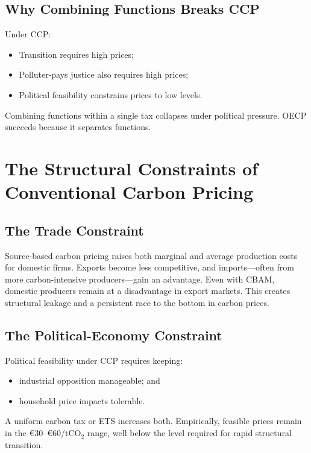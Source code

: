 \documentclass[12pt]{article}
\begin{document}
\subsection{Why Combining Functions Breaks CCP}

Under CCP:
\begin{itemize}
    \item Transition requires high prices;  
    \item Polluter-pays justice also requires high prices;  
    \item Political feasibility constrains prices to low levels.
\end{itemize}
Combining functions within a single tax collapses under political pressure.  
OECP succeeds because it separates functions.


\section{The Structural Constraints of Conventional Carbon Pricing}

\subsection{The Trade Constraint}

Source-based carbon pricing raises both marginal and average production costs 
for domestic firms.  
Exports become less competitive, and imports—often from more carbon-intensive 
producers—gain an advantage.  
Even with CBAM, domestic producers remain at a disadvantage in export markets.  
This creates structural leakage and a persistent race to the bottom in carbon prices.

\subsection{The Political-Economy Constraint}

Political feasibility under CCP requires keeping:
\begin{itemize}
    \item industrial opposition manageable; and
    \item household price impacts tolerable.
\end{itemize}
A uniform carbon tax or ETS increases both.  
Empirically, feasible prices remain in the €30–€60/tCO$_2$ range, well below 
the level required for rapid structural transition.
\end{document}
